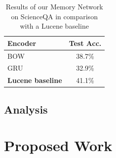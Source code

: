 \begin{table}
    \centering
    \begin{tabular}{|l|c|}
    \hline
    \textbf{Encoder} & \textbf{Test Acc.}\\
    \hline
    BOW & 38.7\% \\
    GRU & 32.9\% \\
    \hline
    \hline
    \textbf{Lucene baseline} & 41.1\% \\
    \hline
    \end{tabular}
    \caption{Results of our Memory Network on ScienceQA in comparison with a Lucene baseline}
    \label{tab:memnet_qa_results}
\end{table}


\subsection{Analysis}

\section{Proposed Work}